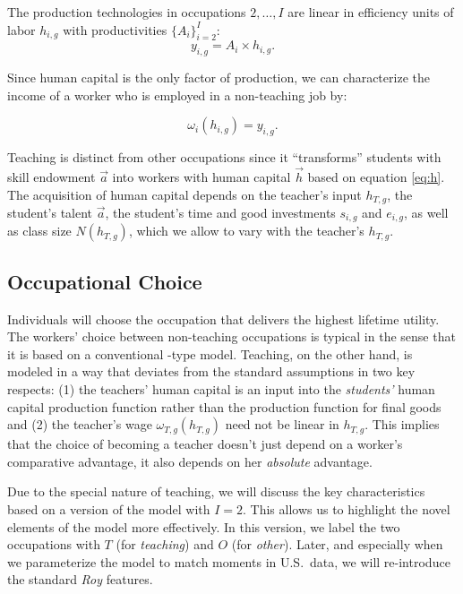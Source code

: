 \documentclass[onehalfspacing,11pt]{article}
\begin{document}
The production technologies in occupations $2,\ldots,I$ are linear in efficiency units of labor $h_{i,g}$ with productivities $\{A_i\}_{i=2}^I$:
\begin{equation}
\label{ }
y_{i,g} = A_i \times h_{i,g}.
\end{equation}

Since human capital is the only factor of production, we can characterize the income of a worker who is employed in a non-teaching job by:

\begin{equation}
\label{ }
\omega_{i} \left( h_{i,g} \right) = y_{i,g}.
\end{equation}

Teaching is distinct from other occupations since it ``transforms'' students with skill endowment $\vec{a}$ into workers with human capital $\vec{h}$ based on equation \eqref{eq:h}. The acquisition of human capital depends on the teacher's input $h_{T,g}$, the student's talent $\vec{a}$, the student's time and good investments $s_{i,g}$ and $e_{i,g}$, as well as class size $N(h_{T,g})$, which we allow to vary with the teacher's $h_{T,g}$.

\subsection{Occupational Choice}

Individuals will choose the occupation that delivers the highest lifetime utility. The workers' choice between non-teaching occupations is typical in the sense that it is based on a conventional \cite{Roy:1951}-type model. Teaching, on the other hand, is modeled in a way that deviates from the standard assumptions in two key respects: (1) the teachers' human capital is an input into the {\it students'} human capital production function rather than the production function for final goods and (2) the teacher's wage $\omega_{T,g}\left( h_{T,g} \right)$ need not be linear in $h_{T,g}$. This implies that the choice of becoming a teacher doesn't just depend on a worker's comparative advantage, it also depends on her {\it absolute} advantage.

Due to the special nature of teaching, we will discuss the key characteristics based on a version of the model with $I=2$. This allows us to highlight the novel elements of the model more effectively. In this version, we label the two occupations with $T$ (for {\it teaching}) and $O$ (for {\it other}). Later, and especially when we parameterize the model to match moments in U.S.~data, we will re-introduce the standard {\it Roy} features.
\end{document}
